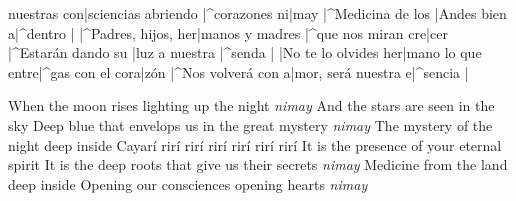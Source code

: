 nuestras con|sciencias abriendo |^corazones ni|may
    |^Medicina de los |Andes bien a|^dentro | \e
  \endverse
  \beginverse
    |^Padres, hijos, her|manos y madres |^que nos miran cre|cer
    |^Estarán dando su |luz a nuestra |^senda | \e
    |No te lo olvides her|mano lo que entre|^gas con el cora|zón
    |^Nos volverá con a|mor, será nuestra e|^sencia | \e
  \endverse
  \begin{translation}
    When the moon rises lighting up the night \emph{nimay}
    And the stars are seen in the sky
    Deep blue that envelops us in the great mystery \emph{nimay}
    The mystery of the night deep inside
    \nextverse
    Cayarí rirí rirí rirí rirí rirí rirí
    It is the presence of your eternal spirit
    \nextverse
    It is the deep roots that give us their secrets \emph{nimay}
    Medicine from the land deep inside
    Opening our consciences opening hearts \emph{nimay}

\end{translation}\]\]\]\]\]\]\]\]\]\]\]\]\]\]\]\]\]\]\]\]\]\]\]\]\]\]\]\]\]\]\]\]\]\]\]\]\]\]\]\]\]\]\]\]\]\]\]\]\]\]\]\]\]\]\]\]\]\]\]\]\]\]\]\]\]\]\]\]\]\]\]\]\]\]\]\]\]\]\]\]\]\]\]\]\]\]\]\]\]\]\]\]\]\]\]\]\]\]\]\]\]\]\]\]\]\]\]\]\]\]\]\]\]\]\]\]\]\]\]\]\]\]\]\]\]\]\]\]\]\]\]\]\]\]\]\]\]\]\]\]\]\]\]\]\]\]\]\]\]\]\]\]\]\]\]\]\]\]\]\]\]\]\]\]\]\]\]\]\]\]\]\]\]\]\]\]\]\]\]\]\]\]\]\]\]\]\]\]\]\]\]\]\]\]\]\]\]\]\]\]\]\]\]\]\]\]\]\]\]\]\]\]\]\]\]\]\]\]\]\]\]\]\]\]\]\]\]\]\]\]\]\]\]\]\]\]\]\]\]\]\]\]\]\]\]\]\]\]\]\]\]\]\]\]\]\]\]\]\]\]\]\]\]\]\]\]\]\]\]\]\]\]\]\]\]\]\]\]\]\]\]\]\]\]\]\]\]\]\]\]\]\]\]\]\]\]\]\]\]\]\]\]\]\]\]\]\]\]\]\]\]\]\]\]\]\]\]\]\]\]\]\]\]\]\]\]\]\]\]\]\]\]\]\]\]\]\]\]\]\]\]\]\]\]\]\]\]\]\]\]\]\]\]\]\]\]\]\]\]\]\]\]\]\]\]\]\]\]\]\]\]\]\]\]\]\]\]\]\]\]\]\]\]\]\]\]\]\]\]\]\]\]\]\]\]\]\]\]\]\]\]\]\]\]\]\]\]\]\]\]\]\]\]\]\]\]\]\]\]\]\]\]\]\]\]\]\]\]\]\]\]\]\]\]\]\]\]\]\]\]\]\]\]\]\]\]\]\]\]\]\]\]\]\]\]\]\]\]\]\]\]\]\]\]\]\]\]\]\]\]\]\]\]\]\]\]\]\]\]\]\]\]\]\]\]\]\]\]\]\]\]\]\]\]\]\]\]\]\]\]\]\]\]\]\]\]\]\]\]\]\]\]\]\]\]\]\]\]\]\]\]\]\]\]\]\]\]\]\]\]\]\]\]\]\]\]\]\]\]\]\]\]\]\]\]\]\]\]\]\]\]\]\]\]\]\]\]\]\]\]\]\]\]\]\]\]\]\]\]\]\]\]\]\]\]\]\]\]\]\]\]\]\]\]\]\]\]\]\]\]\]\]\]\]\]\]\]\]\]\]\]\]\]\]\]\]\]\]\]\]\]\]\]\]\]\]\]\]\]\]\]\]\]\]\]\]\]\]\]\]\]\]\]\]\]\]\]\]\]\]\]\]\]\]\]\]\]\]\]\]\]\]\]\]\]\]\]\]\]\]\]\]\]\]\]\]\]\]\]\]\]\]\]\]\]\]\]\]\]\]\]\]\]\]\]\]\]\]\]\]\]\]\]\]\]\]\]\]\]\]\]\]\]\]\]\]\]\]\]\]\]\]\]\]\]\]\]\]\]\]\]\]\]\]\]\]\]\]\]\]\]\]\]\]\]\]\]\]\]\]\]\]\]\]\]\]\]\]\]\]\]\]\]\]\]\]\]\]\]\]\]\]\]\]\]\]\]\]\]\]\]\]\]\]\]\]\]\]\]\]\]\]\]\]\]\]\]\]\]\]\]\]\]\]\]\]\]\]\]\]\]\]\]\]\]\]\]\]\]\]\]\]\]\]\]\]\]\]\]\]\]\]\]\]\]\]\]\]\]\]\]\]\]\]\]\]\]\]\]\]\]\]\]\]\]\]\]\]\]\]\]\]\]\]\]\]\]\]\]\]\]\]\]\]\]\]\]\]\]\]\]\]\]\]\]\]\]\]\]\]\]\]\]\]\]\]\]\]\]\]\]\]\]\]\]\]\]\]\]\]\]\]\]\]\]\]\]\]\]\]\]\]\]\]\]\]\]\]\]\]\]\]\]\]\]\]\]\]\]\]\]\]\]\]\]\]\]\]\]\]\]\]\]\]\]\]\]\]\]\]\]\]\]\]\]\]\]\]\]\]\]\]\]\]\]\]\]\]\]\]\]\]\]\]\]\]\]\]\]\]\]\]\]\]\]\]\]\]\]\]\]\]\]\]\]\]\]\]\]\]\]\]\]\]\]\]\]\]\]\]\]\]\]\]\]\]\]\]\]\]\]\]\]\]\]\]\]\]\]\]\]\]\]\]\]\]\]\]\]\]\]\]\]\]\]\]\]\]\]\]\]\]\]\]\]\]\]\]\]\]\]\]\]\]\]\]\]\]\]\]\]\]\]\]\]\]\]\]\]\]\]\]\]\]\]\]\]\]\]\]\]\]\]\]\]\]\]\]\]\]\]\]\]\]\]\]\]\]\]\]\]\]\]\]\]\]\]\]\]\]\]\]\]\]\]\]\]\]\]\]\]\]\]\]\]\]\]\]\]\]\]\]\]\]\]\]\]\]\]\]\]\]\]\]\]\]\]\]\]\]\]\]\]\]\]\]\]\]\]\]\]\]\]\]\]\]\]\]\]\]\]\]\]\]\]\]\]\]\]\]\]\]\]\]\]\]\]\]\]\]\]\]\]\]\]\]\]\]\]\]\]
